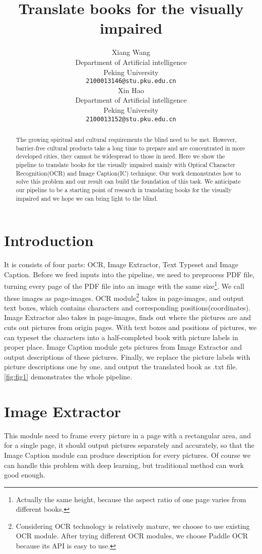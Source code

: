 \documentclass{article}
\title{Translate books for the visually impaired}
\author{
  Xiang Wang\\
  Department of Artificial intelligence\\
  Peking University\\
  \texttt{2100013146@stu.pku.edu.cn} \\
  \And
  Xin Hao \\
  Department of Artificial intelligence\\
  Peking University\\
  \texttt{2100013152@stu.pku.edu.cn} \\
}
\begin{document}
\maketitle

\begin{abstract}
  The growing spiritual and cultural requirements the blind need to be met. 
  However, barrier-free cultural products take a long time to prepare and are concentrated in more developed cities, they cannot be widespread to those in need. 
  Here we show the pipeline to translate books for the visually impaired mainly with Optical Character Recognition(OCR) and Image Caption(IC) technique. 
  Our work demonstrates how to solve this problem and our result can build the foundation of this task. 
  We anticipate our pipeline to be a starting point of research in translating books for the visually impaired and we hope we can bring light to the blind. 
\end{abstract}

\section{Introduction}
It is consists of four parts: OCR, Image Extractor, Text Typeset and Image Caption. 
Before we feed inputs into the pipeline, we need to preprocess PDF file, turning every page of the PDF file into an image with the same size\footnote{
Actually the same height, because the aspect ratio of one page varies from different books.
}. We call these images as page-images.
OCR module\footnote{
Considering OCR technology is relatively mature, we choose to use existing OCR module. After trying different OCR modules, we choose Paddle OCR because its API is easy to use.
} takes in page-images, and output text boxes, which contains characters and corresponding positions(coordinates). 
Image Extractor also takes in page-images, finds out where the pictures are and cuts out pictures from origin pages. 
With text boxes and positions of pictures, we can typeset the characters into a half-completed book with picture labels in proper place. 
Image Caption module gets pictures from Image Extractor and output descriptions of these pictures. 
Finally, we replace the picture labels with picture descriptions one by one, and output the translated book as .txt file.
\cref{fig:fig1} demonstrates the whole pipeline.

\section{Image Extractor}
This module need to frame every picture in a page with a rectangular area, 
and for a single page, it should output pictures separately and accurately, so that the Image Caption module can produce description for every pictures. 
Of course we can handle this problem with deep learning, but traditional method can work good enough. 
\end{document}
